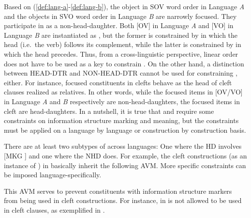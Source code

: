 \noindent Based on (\ref{def:lang-a}-\ref{def:lang-b}), the object in
SOV word order in Language \textit{A} and the objects in SVO word
order in Language \textit{B} are narrowly focused.
They participate in  as a non-head-daughter. Both
[OV] in Language \textit{A} and [VO] in Language \textit{B} are
instantiated as , but the former is constrained
by  in which the head (i.e.\ the verb) follows its
complement, while the latter is constrained by  in
which the head precedes. Thus, from a cross-linguistic perspective,
linear order does not have to be used as a key to constrain
. On the other hand, a distinction
between HEAD-DTR and NON-HEAD-DTR cannot be used for constraining
, either.  For instance, focused constituents in
clefts behave as the head of cleft clauses realized as
relatives. In other words, while the focused items in
[OV/VO] in Language \textit{A} and \textit{B} respectively are
non-head-daughters, the focused items in cleft are head-daughters. In
a nutshell, it is true that  and 
require some constraints on information structure marking and meaning,
but the constraints must be applied on a language by language or
construction by construction basis.


There are at least two subtypes of  across languages:
One where the HD involves [MKG ] and one where the NHD does.
For example, the cleft constructions (as an instance of
) in  basically inherit the following
AVM. More specific constraints can be imposed
language-specifically.


\noindent This AVM serves to prevent constituents with information
structure markers from being used in cleft constructions. For
instance, \nun in  is not allowed to be used in cleft
clauses, as exemplified in .



